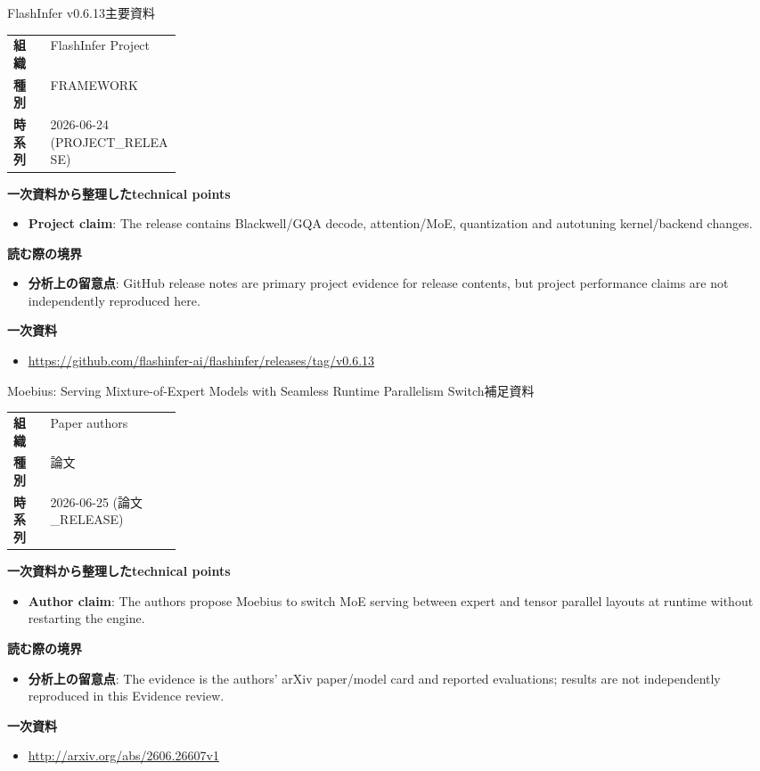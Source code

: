 \begin{technicalnote}{FlashInfer v0.6.13}{主要資料}
\begin{tabularx}{\linewidth}{@{}>{\bfseries}p{0.22\linewidth}X@{}}
組織 & FlashInfer Project \\
種別 & FRAMEWORK \\
時系列 & 2026-06-24 (PROJECT\_RELEASE) \\
\end{tabularx}
\smallskip
{\bfseries 一次資料から整理したtechnical points}
\begin{itemize}[leftmargin=1.5em,itemsep=0.35em]
\item \textbf{Project claim}: The release contains Blackwell/GQA decode, attention/MoE, quantization and autotuning kernel/backend changes.
\end{itemize}
{\bfseries 読む際の境界}
\begin{itemize}[leftmargin=1.5em,itemsep=0.35em]
\item \textbf{分析上の留意点}: GitHub release notes are primary project evidence for release contents, but project performance claims are not independently reproduced here.
\end{itemize}
{\bfseries 一次資料}
\begingroup\sloppy
\begin{itemize}[leftmargin=1.5em,itemsep=0.25em]
\item {\scriptsize\url{https://github.com/flashinfer-ai/flashinfer/releases/tag/v0.6.13}}
\end{itemize}
\endgroup
\end{technicalnote}
\medskip

\begin{technicalnote}{Moebius: Serving Mixture-of-Expert Models with Seamless Runtime Parallelism Switch}{補足資料}
\begin{tabularx}{\linewidth}{@{}>{\bfseries}p{0.22\linewidth}X@{}}
組織 & Paper authors \\
種別 & 論文 \\
時系列 & 2026-06-25 (論文\_RELEASE) \\
\end{tabularx}
\smallskip
{\bfseries 一次資料から整理したtechnical points}
\begin{itemize}[leftmargin=1.5em,itemsep=0.35em]
\item \textbf{Author claim}: The authors propose Moebius to switch MoE serving between expert and tensor parallel layouts at runtime without restarting the engine.
\end{itemize}
{\bfseries 読む際の境界}
\begin{itemize}[leftmargin=1.5em,itemsep=0.35em]
\item \textbf{分析上の留意点}: The evidence is the authors' arXiv paper/model card and reported evaluations; results are not independently reproduced in this Evidence review.
\end{itemize}
{\bfseries 一次資料}
\begingroup\sloppy
\begin{itemize}[leftmargin=1.5em,itemsep=0.25em]
\item {\scriptsize\url{http://arxiv.org/abs/2606.26607v1}}
\end{itemize}
\endgroup
\end{technicalnote}
\medskip

